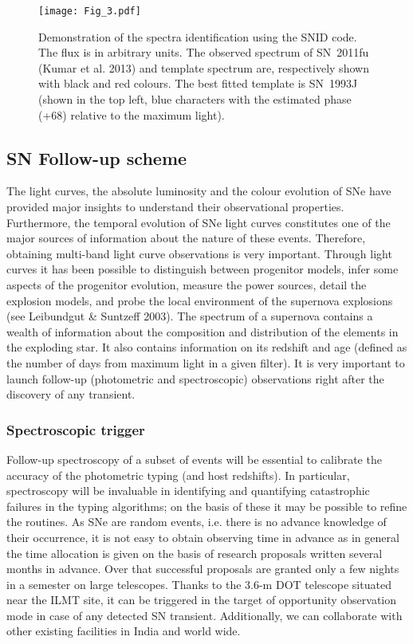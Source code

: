\documentclass[12pt,a4paper]{article}
\begin{document}

\begin{figure*}
\centering
\texttt{[image: Fig\_3.pdf]}
\caption{Demonstration of the spectra identification using the SNID code. The flux is in arbitrary
units. The observed spectrum of SN~2011fu (Kumar et al. 2013) and template spectrum are, respectively 
shown with black and red colours. The best fitted template is SN~1993J (shown in the top left, blue 
characters with the estimated phase (+68) relative to the maximum light).}
\label{snid_test}
\end{figure*}

\subsection{SN Follow-up scheme}

The light curves, the absolute luminosity and the colour evolution of SNe have provided major insights
to understand their observational properties. Furthermore, the temporal evolution of SNe light curves
constitutes one of the major sources of information about the nature of these events. Therefore, obtaining 
multi-band light curve observations is very important.
Through light curves it has been possible to distinguish between progenitor models, infer some aspects 
of the progenitor evolution, measure the power sources, detail the explosion models, and probe the local 
environment of the supernova explosions (see Leibundgut \& Suntzeff 2003). 
The spectrum of a supernova contains a wealth of information about the composition
and distribution of the elements in the exploding star. It also contains information on
its redshift and age (defined as the number of days from maximum light in a given filter).
It is very important to launch follow-up (photometric and spectroscopic) observations
right after the discovery of any transient.

\subsubsection{Spectroscopic trigger}

Follow-up spectroscopy of a subset of events will be essential to calibrate the accuracy of the photometric 
typing (and host redshifts). In particular, spectroscopy will be invaluable in identifying and quantifying 
catastrophic failures in the typing algorithms; on the basis of these it may be possible to refine the routines.
As SNe are random events, i.e. there is no advance knowledge of their occurrence, 
it is not easy to obtain observing time in advance as in general the time allocation is given 
on the basis of research proposals written several months in advance. Over that successful proposals are
granted only a few nights in a semester on large telescopes. Thanks to the 3.6-m DOT telescope situated near 
the ILMT site, it can be triggered in the target of opportunity observation mode in case of any detected SN 
transient. Additionally, we can collaborate with other existing facilities in India and world wide.
\end{document}
